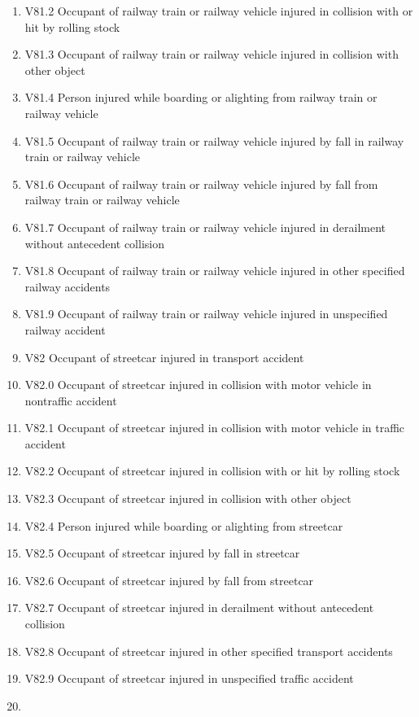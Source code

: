 \documentclass[
]{scrartcl}
\begin{document}
\begin{itemize}
\begin{enumerate}
  \item
    V81.2 Occupant of railway train or railway vehicle injured in
    collision with or hit by rolling stock
  \item
    V81.3 Occupant of railway train or railway vehicle injured in
    collision with other object
  \item
    V81.4 Person injured while boarding or alighting from railway train
    or railway vehicle
  \item
    V81.5 Occupant of railway train or railway vehicle injured by fall
    in railway train or railway vehicle
  \item
    V81.6 Occupant of railway train or railway vehicle injured by fall
    from railway train or railway vehicle
  \item
    V81.7 Occupant of railway train or railway vehicle injured in
    derailment without antecedent collision
  \item
    V81.8 Occupant of railway train or railway vehicle injured in other
    specified railway accidents
  \item
    V81.9 Occupant of railway train or railway vehicle injured in
    unspecified railway accident
  \item
    V82 Occupant of streetcar injured in transport accident
  \item
    V82.0 Occupant of streetcar injured in collision with motor vehicle
    in nontraffic accident
  \item
    V82.1 Occupant of streetcar injured in collision with motor vehicle
    in traffic accident
  \item
    V82.2 Occupant of streetcar injured in collision with or hit by
    rolling stock
  \item
    V82.3 Occupant of streetcar injured in collision with other object
  \item
    V82.4 Person injured while boarding or alighting from streetcar
  \item
    V82.5 Occupant of streetcar injured by fall in streetcar
  \item
    V82.6 Occupant of streetcar injured by fall from streetcar
  \item
    V82.7 Occupant of streetcar injured in derailment without antecedent
    collision
  \item
    V82.8 Occupant of streetcar injured in other specified transport
    accidents
  \item
    V82.9 Occupant of streetcar injured in unspecified traffic accident
  \item

\end{enumerate}
\end{itemize}
\end{document}
